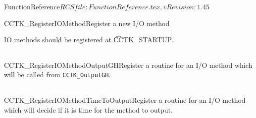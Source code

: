 \begin{cactuspart}{5}{FunctionReference}{$RCSfile: FunctionReference.tex,v $}{$Revision: 1.45 $}
\begin{CCTKFunc}{CCTK\_RegisterIOMethod}{Register a new I/O method}
\label{CCTK-RegisterIOMethod}
\showargs
\begin{params}
\end{params}
\begin{discussion}
IO methods should be registered at {\t CCTK\_STARTUP}.
\end{discussion}
\begin{examples}
\begin{tabular}{@{}p{3cm}cp{11cm}}
\end{tabular}
\end{examples}
\begin{errorcodes}
\end{errorcodes}
\end{CCTKFunc}


\begin{CCTKFunc}{CCTK\_RegisterIOMethodOutputGH}{Register a routine for an I/O method which will be called from {\tt CCTK\_OutputGH}.}
\label{CCTK-RegisterIOMethodOutputGH}
\showcargs
\begin{params}
\end{params}
\begin{discussion}
\end{discussion}
\begin{examples}
\begin{tabular}{@{}p{3cm}cp{11cm}}
\end{tabular}
\end{examples}
\begin{errorcodes}
\end{errorcodes}
\end{CCTKFunc}



\begin{CCTKFunc}{CCTK\_RegisterIOMethodTimeToOutput}{Register a routine for an I/O method which will decide if it is time for the method to output.}
\label{CCTK-RegisterIOMethodTimeToOutput}
\showcargs
\begin{params}
\end{params}
\begin{discussion}
\end{discussion}
\begin{examples}
\begin{tabular}{@{}p{3cm}cp{11cm}}
\end{tabular}
\end{examples}
\begin{errorcodes}
\end{errorcodes}
\end{CCTKFunc}



\end{cactuspart}
